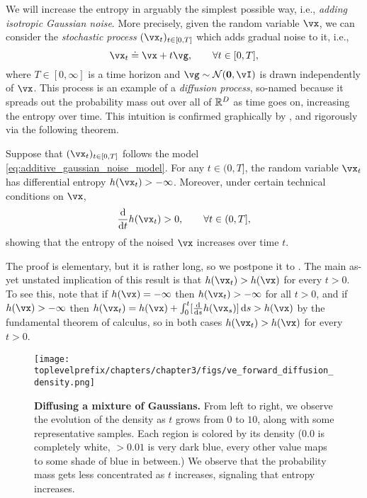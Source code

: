 \documentclass[../../book-main.tex]{subfiles}
\begin{document}
We will increase the entropy in arguably the simplest possible way, i.e., \textit{adding isotropic Gaussian noise}. More precisely, given the random variable \(\vx\), we can consider the \textit{stochastic process} \((\vx_{t})_{t \in [0, T]}\) which adds gradual noise to it, i.e.,
\begin{equation}\label{eq:additive_gaussian_noise_model}
	\vx_{t} \doteq \vx + t\vg, \qquad \forall t \in [0, T],
\end{equation}
where \(T \in [0, \infty]\) is a time horizon and \(\vg \sim \dNorm(\vzero, \vI)\) is drawn independently of \(\vx\). This process is an example of a \textit{diffusion process}, so-named because it spreads out the probability mass out over all of \(\mathbb{R}^{D}\) as time goes on, increasing the entropy over time. This intuition is confirmed graphically by , and rigorously via the following theorem.
\begin{theorem}
	Suppose that \((\vx_{t})_{t \in [0, T]}\) follows the model \eqref{eq:additive_gaussian_noise_model}. For any \(t \in (0, T]\), the random variable \(\vx_{t}\) has differential entropy \(h(\vx_{t}) > -\infty\). Moreover, under certain technical conditions on \(\vx\), 
	\begin{equation}
		\odv*{h(\vx_{t})}{t} > 0, \qquad \forall t \in (0, T],
	\end{equation}
	showing that the entropy of the noised \(\vx\) increases over time \(t\).
\end{theorem}
The proof is elementary, but it is rather long, so we postpone it to . The main as-yet unstated implication of this result is that \(h(\vx_{t}) > h(\vx)\) for every \(t > 0\). To see this, note that if \(h(\vx) = -\infty\) then \(h(\vx_{t}) > -\infty\) for all \(t > 0\),  and if \(h(\vx) > -\infty\) then \(h(\vx_{t}) = h(\vx) + \int_{0}^{t}[\odv*{h(\vx_{s})}{s}]\odif{s} > h(\vx)\) by the fundamental theorem of calculus, so in both cases \(h(\vx_{t}) > h(\vx)\) for every \(t > 0\).

\begin{figure}
	\texttt{[image: \\toplevelprefix/chapters/chapter3/figs/ve\_forward\_diffusion\_density.png]}
	\caption{\small\textbf{Diffusing a mixture of Gaussians.} From left to right, we observe the evolution of the density as \(t\) grows from \(0\) to \(10\), along with some representative samples. Each region is colored by its density (\(0.0\) is completely white, \(> 0.01\) is very dark blue, every other value maps to some shade of blue in between.) We observe that the probability mass gets less concentrated as \(t\) increases, signaling that entropy increases.}
	\label{fig:ve_forward_density}
\end{figure}
\end{document}
